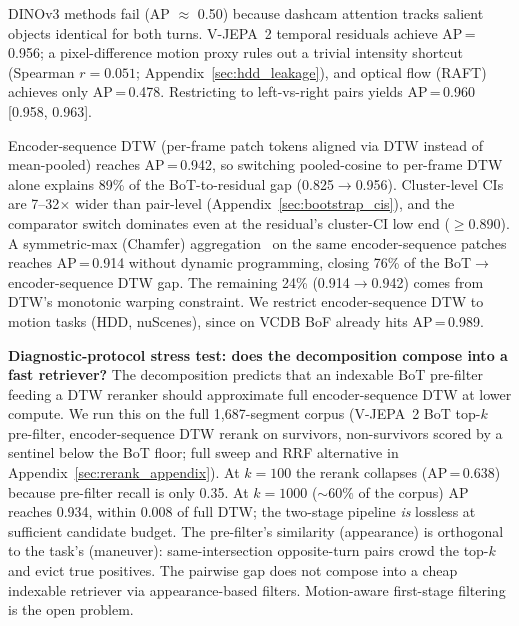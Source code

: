 \documentclass{article}
\theoremstyle{remark}
\begin{document}
DINOv3 methods fail (AP $\approx$ 0.50) because dashcam attention tracks salient objects identical for both turns. V-JEPA~2 temporal residuals achieve AP\,=\,0.956; a pixel-difference motion proxy rules out a trivial intensity shortcut (Spearman $r = 0.051$; Appendix~\ref{sec:hdd_leakage}), and optical flow (RAFT) achieves only AP\,=\,0.478. Restricting to left-vs-right pairs yields AP\,=\,0.960 [0.958, 0.963].

Encoder-sequence DTW (per-frame patch tokens aligned via DTW instead of mean-pooled) reaches AP\,=\,0.942, so switching pooled-cosine to per-frame DTW alone explains 89\% of the BoT-to-residual gap (0.825$\to$0.956). Cluster-level CIs are 7--32$\times$ wider than pair-level (Appendix~\ref{sec:bootstrap_cis}), and the comparator switch dominates even at the residual's cluster-CI low end ($\geq$0.890). A symmetric-max (Chamfer) aggregation~\cite{kordopatis2019visil} on the same encoder-sequence patches reaches AP\,=\,0.914 without dynamic programming, closing 76\% of the BoT$\to$encoder-sequence DTW gap. The remaining 24\% (0.914$\to$0.942) comes from DTW's monotonic warping constraint. We restrict encoder-sequence DTW to motion tasks (HDD, nuScenes), since on VCDB BoF already hits AP\,=\,0.989.

\textbf{Diagnostic-protocol stress test: does the decomposition compose into a fast retriever?} The decomposition predicts that an indexable BoT pre-filter feeding a DTW reranker should approximate full encoder-sequence DTW at lower compute. We run this on the full 1{,}687-segment corpus (V-JEPA~2 BoT top-$k$ pre-filter, encoder-sequence DTW rerank on survivors, non-survivors scored by a sentinel below the BoT floor; full sweep and RRF alternative in Appendix~\ref{sec:rerank_appendix}). At $k\!=\!100$ the rerank collapses (AP\,=\,0.638) because pre-filter recall is only 0.35. At $k\!=\!1000$ ($\sim\!60\%$ of the corpus) AP reaches 0.934, within 0.008 of full DTW; the two-stage pipeline \emph{is} lossless at sufficient candidate budget. The pre-filter's similarity (appearance) is orthogonal to the task's (maneuver): same-intersection opposite-turn pairs crowd the top-$k$ and evict true positives. The pairwise gap does not compose into a cheap indexable retriever via appearance-based filters. Motion-aware first-stage filtering is the open problem.
\end{document}
